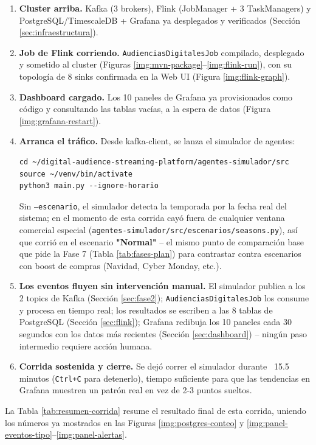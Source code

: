 \begin{enumerate}
\item \textbf{Cluster arriba.} Kafka (3 brokers), Flink (JobManager + 3 TaskManagers) y PostgreSQL/TimescaleDB + Grafana ya desplegados y verificados (Sección \ref{sec:infraestructura}).
\item \textbf{Job de Flink corriendo.} \texttt{AudienciasDigitalesJob} compilado, desplegado y sometido al cluster (Figuras \ref{img:mvn-package}--\ref{img:flink-run}), con su topología de 8 sinks confirmada en la Web UI (Figura \ref{img:flink-graph}).
\item \textbf{Dashboard cargado.} Los 10 paneles de Grafana ya provisionados como código y consultando las tablas vacías, a la espera de datos (Figura \ref{img:grafana-restart}).
\item \textbf{Arranca el tráfico.} Desde kafka-client, se lanza el simulador de agentes:
\begin{lstlisting}[style=cmdbox]
cd ~/digital-audience-streaming-platform/agentes-simulador/src
source ~/venv/bin/activate
python3 main.py --ignore-horario
\end{lstlisting}
Sin \texttt{--escenario}, el simulador detecta la temporada por la fecha real del sistema; en el momento de esta corrida cayó fuera de cualquier ventana comercial especial (\texttt{agentes-simulador/src/escenarios/seasons.py}), así que corrió en el escenario \textbf{"Normal"} -- el mismo punto de comparación base que pide la Fase 7 (Tabla \ref{tab:fases-plan}) para contrastar contra escenarios con boost de compras (Navidad, Cyber Monday, etc.).
\item \textbf{Los eventos fluyen sin intervención manual.} El simulador publica a los 2 topics de Kafka (Sección \ref{sec:fase2}); \texttt{AudienciasDigitalesJob} los consume y procesa en tiempo real; los resultados se escriben a las 8 tablas de PostgreSQL (Sección \ref{sec:flink}); Grafana redibuja los 10 paneles cada 30 segundos con los datos más recientes (Sección \ref{sec:dashboard}) -- ningún paso intermedio requiere acción humana.
\item \textbf{Corrida sostenida y cierre.} Se dejó correr el simulador durante ~15.5 minutos (\texttt{Ctrl+C} para detenerlo), tiempo suficiente para que las tendencias en Grafana muestren un patrón real en vez de 2-3 puntos sueltos.
\end{enumerate}

La Tabla \ref{tab:resumen-corrida} resume el resultado final de esta corrida, uniendo los números ya mostrados en las Figuras \ref{img:postgres-conteo} y \ref{img:panel-eventos-tipo}--\ref{img:panel-alertas}.

